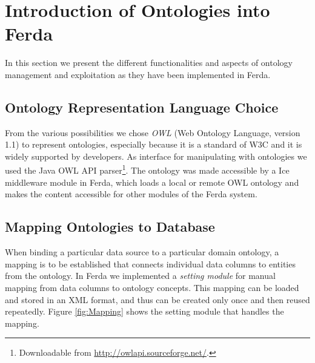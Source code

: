 \section{Introduction of Ontologies into Ferda} \label{OntologiesFerda}

In this section we present the different functionalities and aspects of ontology management and exploitation as they have been implemented in Ferda.

\subsection{Ontology Representation Language Choice}

From the various possibilities we chose \emph{OWL} (Web Ontology Language, version 1.1) to represent ontologies, especially because it is a standard of W3C and it is widely supported by developers. 
As interface for manipulating with ontologies we used the Java OWL API parser\footnote{%
Downloadable from \url{http://owlapi.sourceforge.net/}.}. 
The ontology was made accessible by a Ice middleware module in Ferda, which loads a local or remote OWL ontology and makes the content accessible for other modules of the Ferda system. 

\subsection{Mapping Ontologies to Database}

When binding a particular data source to a particular domain ontology, a mapping is to be established that connects individual data columns to entities from the ontology.
In Ferda we implemented a \emph{setting module} for manual mapping from data columns to ontology concepts. 
This mapping can be loaded and stored in an XML format, and thus can be created only once and then reused repeatedly. 
Figure \ref{fig:Mapping} shows the setting module that handles the mapping.

